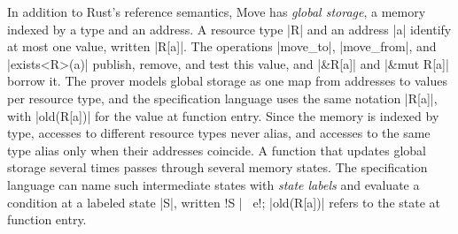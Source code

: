 \label{sec:globals}

In addition to Rust's reference semantics, Move has \emph{global storage}, a memory indexed by a type and an address.
A resource type |R| and an address |a| identify at most one value, written |R[a]|.
The operations |move_to|, |move_from|, and |exists<R>(a)| publish, remove, and test this value, and |&R[a]| and |&mut R[a]| borrow it.
The prover models global storage as one map from addresses to values per resource type, and the specification language uses the same notation |R[a]|, with |old(R[a])| for the value at function entry.
Since the memory is indexed by type, accesses to different resource types never alias, and accesses to the same type alias only when their addresses coincide.
A function that updates global storage several times passes through several memory states.
The specification language can name such intermediate states with \emph{state labels} and evaluate a condition at a labeled state |S|, written !S |~ e!; |old(R[a])| refers to the state at function entry.

\label{sec:transformer}

